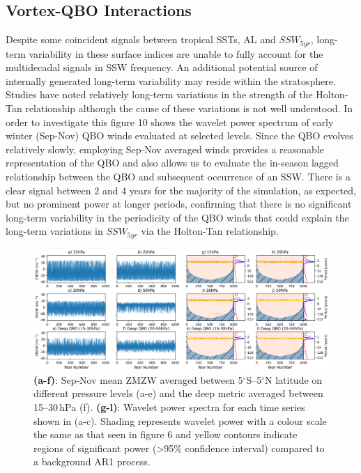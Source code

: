 \subsection{Vortex-QBO Interactions}
Despite some coincident signals between tropical SSTs, AL and $SSW_{5yr}$, long-term variability in these surface indices are unable to fully account for the  multidecadal signals in SSW frequency. An additional potential source of internally generated long-term variability may reside within the stratosphere. Studies have noted relatively long-term variations in the strength of the Holton-Tan relationship \citep{Lu2008, Lu14, OspEA10} although the cause of these variations is not well understood. In order to investigate this figure 10 shows the wavelet power spectrum of early winter (Sep-Nov) QBO winds evaluated at selected levels. Since the QBO evolves relatively slowly, employing Sep-Nov averaged winds provides a reasonable representation of the QBO and also allows us to evaluate the in-season lagged relationship between the QBO and subsequent occurrence of an SSW. There is a clear signal between 2 and 4 years for the majority of the simulation, as expected, but no prominent power at longer periods,  confirming that there is no significant long-term variability in the periodicity of the QBO winds that could explain the long-term variations in $SSW_{5yr}$ via the Holton-Tan relationship.

\begin{center}
\begin{figure}[h!]
\noindent\includegraphics[width = \linewidth]{Figures/Figures-origins/QBO_levels.png}
\caption{\textbf{(a-f)}: Sep-Nov mean ZMZW averaged between 5$^\circ$S--5$^\circ$N latitude on different pressure levels (a-e) and the deep metric averaged between 15--30\,hPa (f). \textbf{(g-l)}: Wavelet power spectra for each time series shown in (a-c). Shading represents wavelet power with a colour scale the same as that seen in figure 6 and yellow contours indicate regions of significant power (>95\% confidence interval) compared to a background AR1 process.}
\label{QBO_levs}
\end{figure}
\end{center}

